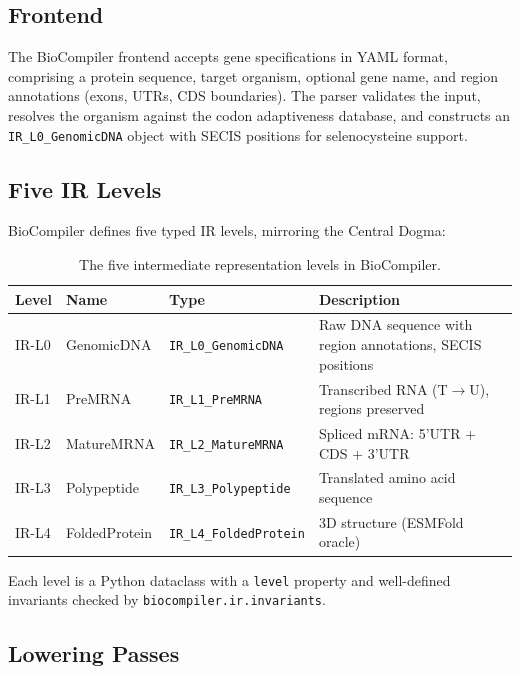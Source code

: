 \documentclass[11pt,a4paper]{article}
\theoremstyle{definition}
\begin{document}
\subsection{Frontend}\label{sec:frontend}

The BioCompiler frontend accepts gene specifications in YAML format, comprising a protein sequence, target organism, optional gene name, and region annotations (exons, UTRs, CDS boundaries). The parser validates the input, resolves the organism against the codon adaptiveness database, and constructs an \texttt{IR\_L0\_GenomicDNA} object with SECIS positions for selenocysteine support.

\subsection{Five IR Levels}

BioCompiler defines five typed IR levels, mirroring the Central Dogma:

\begin{table}[!ht]
\centering
\begin{tabular}{lllp{6cm}}
\toprule
\textbf{Level} & \textbf{Name} & \textbf{Type} & \textbf{Description} \\
\midrule
IR-L0 & GenomicDNA & \texttt{IR\_L0\_GenomicDNA} & Raw DNA sequence with region annotations, SECIS positions \\
IR-L1 & PreMRNA & \texttt{IR\_L1\_PreMRNA} & Transcribed RNA (T$\to$U), regions preserved \\
IR-L2 & MatureMRNA & \texttt{IR\_L2\_MatureMRNA} & Spliced mRNA: 5'UTR + CDS + 3'UTR \\
IR-L3 & Polypeptide & \texttt{IR\_L3\_Polypeptide} & Translated amino acid sequence \\
IR-L4 & FoldedProtein & \texttt{IR\_L4\_FoldedProtein} & 3D structure (ESMFold oracle) \\
\bottomrule
\end{tabular}
\caption{The five intermediate representation levels in BioCompiler.}
\label{tab:ir-levels}
\end{table}

Each level is a Python dataclass with a \texttt{level} property and well-defined invariants checked by \texttt{biocompiler.ir.invariants}.

\subsection{Lowering Passes}
\end{document}
